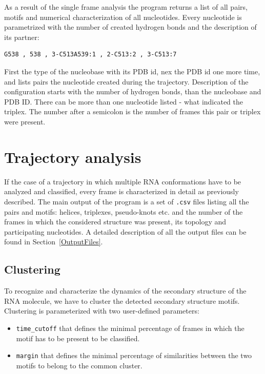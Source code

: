 \documentclass[12pt]{article}
\begin{document}
As a result of the single frame analysis the program returns a list of all pairs, motifs and numerical characterization of all nucleotides. Every nucleotide is parametrized with the number of created hydrogen bonds and the description of its partner:

\begin{verbatim}
G538 , 538 , 3-C513A539:1 , 2-C513:2 , 3-C513:7
\end{verbatim}

First the type of the nucleobase with its PDB id, nex the PDB id one more time, and lists pairs the nucleotide created during the trajectory. Description of the configuration starts with the number of hydrogen bonds, than the nucleobase and PDB ID. There can be more than one nucleotide listed - what indicated the triplex. The number after a semicolon is the number of frames this pair or triplex were present.


\newpage

\section{Trajectory analysis}
If the case of a trajectory in which multiple RNA conformations have to be analyzed and classified, every frame is characterized in detail as previously described. The main output of the program is a set of \texttt{.csv} files listing all the pairs and motifs: helices, triplexes, pseudo-knots etc. and the number of the frames in which the considered structure was present, its topology and participating nucleotides. A detailed description of all the output files can be found in Section~\ref{OutputFiles}.

\subsection{Clustering}
To recognize and characterize the dynamics of the secondary structure of the RNA molecule, we have to cluster the detected secondary structure motifs. Clustering is parameterized with two user-defined parameters: \\
\begin{itemize}
\item \texttt{time\_cutoff} that defines the minimal percentage of frames in which the motif has to be present to be classified.
\item \texttt{margin} that defines the minimal percentage of similarities between the two motifs to belong to the common cluster. 
\end{itemize}
\end{document}
